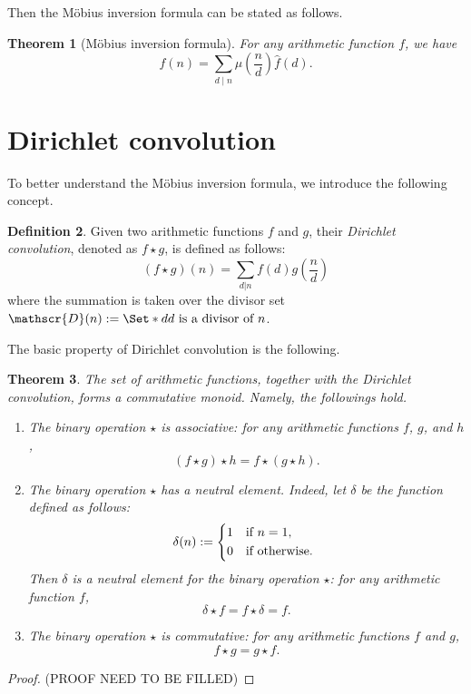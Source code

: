 \documentclass[11pt]{article}
\theoremstyle{plain}
\newtheorem{theorem}{Theorem}[section]
\theoremstyle{definition}
\newtheorem{definition}[theorem]{Definition}
\theoremstyle{remark}
\numberwithin{equation}{section}
\providecommand\given{}
\begin{document}
Then the Möbius inversion formula can be stated as follows.
\begin{theorem}[Möbius inversion formula]\label{thm:mif}
	For any arithmetic function $f$, we have 
	\begin{equation}\label{eq:2}
		f(n) = \sum_{d\mid n} \mu(\frac{n}{d})\widehat{f}(d).
	\end{equation}
\end{theorem}

\section{Dirichlet convolution}\label{sec:2}
To better understand the Möbius inversion formula, we introduce the following concept.
\begin{definition}
	Given two arithmetic functions $f$ and $g$, their \emph{Dirichlet convolution}, denoted as $f \star g$, is defined as follows:
	\begin{equation} 
		(f \star g)(n) = \sum_{d|n} f(d)g\left(\frac{n}{d}\right) 
	\end{equation}
	where the summation is taken over the divisor set $\mathscr{D}(n):=\Set*{ d \given d \text{ is a divisor of } n }$. 
\end{definition}

The basic property of Dirichlet convolution is the following.
\begin{theorem}
	The set of arithmetic functions, together with the Dirichlet convolution, forms a commutative monoid. 
	Namely, the followings hold.
	\begin{enumerate}
		\item The binary operation $\star$ is \emph{associative}: for any arithmetic functions $f$, $g$, and $h$, 
		\begin{equation}
			(f\star g)\star h = f\star (g\star h).
		\end{equation}
		\item The binary operation $\star$ has a \emph{neutral element}. 
		Indeed, let $\delta$ be the function defined as follows:
		\begin{equation*}
			\delta(n) := 
			\begin{dcases*}
				1 & if $n=1$,\\
				0 & if otherwise.
			\end{dcases*}
		\end{equation*}
		Then $\delta$ is a \emph{neutral element} for the binary operation $\star$: for any arithmetic function $f$, 
		\begin{equation}
			\delta\star f = f\star\delta = f.
		\end{equation}
		\item The binary operation $\star$ is \emph{commutative}: for any arithmetic functions $f$ and $g$, 
		\begin{equation}
			f\star g = g\star f.
		\end{equation}
	\end{enumerate}
\end{theorem}
\begin{proof}
	{\color{red} (PROOF NEED TO BE FILLED)}
\end{proof}
\end{document}
